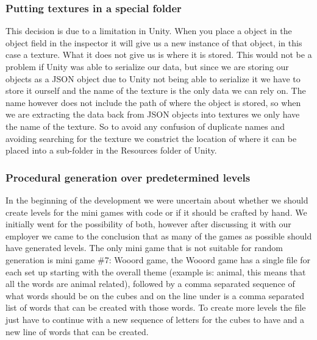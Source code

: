 \subsubsection{Putting textures in a special folder}
This decision is due to a limitation in Unity. When you place a object in the object field in the inspector it will give us a new instance of that object, in this case a texture. What it does not give us is where it is stored. This would not be a problem if Unity was able to serialize our data, but since we are storing our objects as a JSON object due to Unity not being able to serialize it we have to store it ourself and the name of the texture is the only data we can rely on. The name however does not include the path of where the object is stored, so when we are extracting the data back from JSON objects into textures we only have the name of the texture. So to avoid any confusion of duplicate names and avoiding searching for the texture we constrict the location of where it can be placed into a sub-folder in the Resources folder of Unity.

\subsubsection{Procedural generation over predetermined levels}
In the beginning of the development we were uncertain about whether we should create levels for the mini games with code or if it should be crafted by hand. We initially went for the possibility of both, however after discussing it with our employer we came to the conclusion that as many of the games as possible should have generated levels. The only mini game that is not suitable for random generation is mini game \#7: Wooord game, the Wooord game has a single file for each set up starting with the overall theme (example is: animal, this means that all the words are animal related), followed by a comma separated sequence of what words should be on the cubes and on the line under is a comma separated list of words that can be created with those words. To create more levels the file just have to continue with a new sequence of letters for the cubes to have and a new line of words that can be created.

